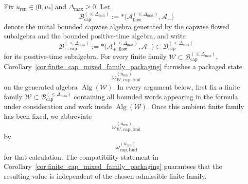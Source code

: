 \begin{theorem}\label{thm:finite_cap_flowed_sector_bridge}
Fix $u_{\mathrm{ren}}\in(0,u_\ast]$ and $\Delta_{\max}\ge 0$.
Let
\[
\mathcal B_{\mathrm{cap}}^{(\le \Delta_{\max})}
:=
\ast\!\bigl(\mathcal A_{\mathrm{flow}}^{(\le \Delta_{\max})},\mathcal A_+\bigr)
\]
denote the unital bounded capwise algebra generated by the capwise flowed subalgebra and the bounded positive-time algebra, and write
\[
\mathcal B_{+,\mathrm{cap}}^{(\le \Delta_{\max})}
:=
\ast\!\bigl(\mathcal A_{+,\mathrm{flow}}^{(\le \Delta_{\max})},\mathcal A_+\bigr)
\subset \mathcal B_{\mathrm{cap}}^{(\le \Delta_{\max})}
\]
for its positive-time subalgebra.
For every finite family $\mathcal W\subset \mathcal B_{\mathrm{cap}}^{(\le \Delta_{\max})}$, Corollary~\ref{cor:finite_cap_mixed_family_packaging} furnishes a packaged state
\[
\omega_{\mathcal W,\mathrm{cap,bnd}}^{(u_{\mathrm{ren}})}
\]
on the generated algebra $\operatorname{Alg}(\mathcal W)$.
In every argument below, first fix a finite family $\mathcal W\subset \mathcal B_{\mathrm{cap}}^{(\le \Delta_{\max})}$ containing all bounded words appearing in the formula under consideration and work inside $\operatorname{Alg}(\mathcal W)$.
Once this ambient finite family has been fixed, we abbreviate
\[
\omega_{\mathcal W,\mathrm{cap,bnd}}^{(u_{\mathrm{ren}})}
\]
by
\[
\omega_{\mathrm{cap,bnd}}^{(u_{\mathrm{ren}})}
\]
for that calculation.
The compatibility statement in Corollary~\ref{cor:finite_cap_mixed_family_packaging} guarantees that the resulting value is independent of the chosen admissible finite family.


\end{theorem}

